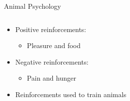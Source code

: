 \documentclass[11pt,table]{beamer}
\begin{document}
\begin{frame}{Animal Psychology}

\begin{columns}[T]
\begin{column}{0.6\textwidth}
\begin{itemize}

    \item Positive reinforcements:
    \begin{itemize}
        \item Pleasure and food
    \end{itemize}
    \item Negative reinforcements:
    \begin{itemize}
        \item Pain and hunger
    \end{itemize}

    \item Reinforcements used to train animals\\[8ex]
\end{itemize}
\end{column}

\begin{column}{0.4\textwidth}
\centering
{}
\end{column}
\end{columns}

\end{frame}
\end{document}

